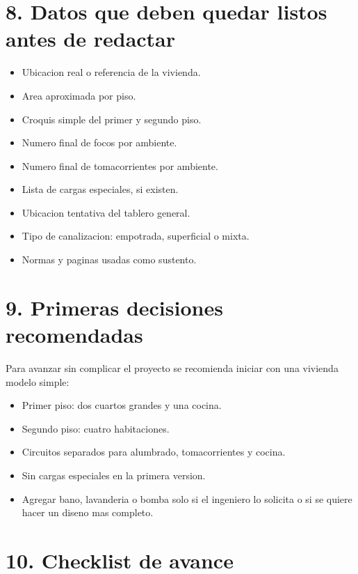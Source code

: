 \documentclass[12pt,a4paper]{article}
\begin{document}
\section*{8. Datos que deben quedar listos antes de redactar}

\begin{itemize}
  \item Ubicacion real o referencia de la vivienda.
  \item Area aproximada por piso.
  \item Croquis simple del primer y segundo piso.
  \item Numero final de focos por ambiente.
  \item Numero final de tomacorrientes por ambiente.
  \item Lista de cargas especiales, si existen.
  \item Ubicacion tentativa del tablero general.
  \item Tipo de canalizacion: empotrada, superficial o mixta.
  \item Normas y paginas usadas como sustento.
\end{itemize}

\section*{9. Primeras decisiones recomendadas}

Para avanzar sin complicar el proyecto se recomienda iniciar con una vivienda modelo simple:

\begin{itemize}
  \item Primer piso: dos cuartos grandes y una cocina.
  \item Segundo piso: cuatro habitaciones.
  \item Circuitos separados para alumbrado, tomacorrientes y cocina.
  \item Sin cargas especiales en la primera version.
  \item Agregar bano, lavanderia o bomba solo si el ingeniero lo solicita o si se quiere hacer un diseno mas completo.
\end{itemize}

\section*{10. Checklist de avance}
\end{document}

